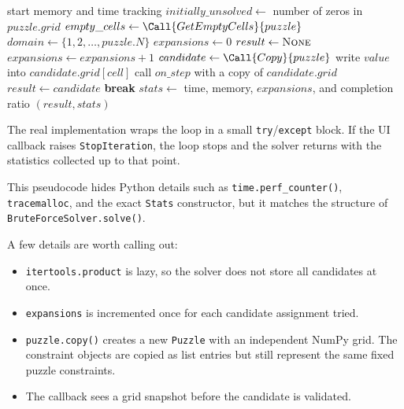 \begin{algorithm}[h]
  \caption{\textsc{BruteForceSolve}}
  \label{alg:brute_force_solve}
  \begin{algorithmic}[1]
      \State start memory and time tracking
      \State $initially\_unsolved \gets$ number of zeros in $puzzle.grid$
      \State $empty\_cells \gets \Call{GetEmptyCells}{puzzle}$
      \State $domain \gets \{1,2,\ldots,puzzle.N\}$
      \State $expansions \gets 0$
      \State $result \gets \textsc{None}$
        \State $expansions \gets expansions + 1$
        \State $candidate \gets \Call{Copy}{puzzle}$
          \State write $value$ into $candidate.grid[cell]$
        \EndFor
          \State call $on\_step$ with a copy of $candidate.grid$
        \EndIf
          \State $result \gets candidate$
          \State \textbf{break}
        \EndIf
      \EndFor
      \State $stats \gets$ time, memory, $expansions$, and completion ratio
      \State \Return $(result, stats)$
    \EndProcedure
  \end{algorithmic}
\end{algorithm}

The real implementation wraps the loop in a small \texttt{try}/\texttt{except}
block. If the UI callback raises \texttt{StopIteration}, the loop stops and the
solver returns with the statistics collected up to that point.

This pseudocode hides Python details such as \texttt{time.perf\_counter()},
\texttt{tracemalloc}, and the exact \texttt{Stats} constructor, but it matches
the structure of \texttt{BruteForceSolver.solve()}.

A few details are worth calling out:

\begin{itemize}
  \item \texttt{itertools.product} is lazy, so the solver does not store all
        candidates at once.
  \item \texttt{expansions} is incremented once for each candidate assignment
        tried.
  \item \texttt{puzzle.copy()} creates a new \texttt{Puzzle} with an independent
        NumPy grid. The constraint objects are copied as list entries but still
        represent the same fixed puzzle constraints.
  \item The callback sees a grid snapshot before the candidate is validated.
\end{itemize}

